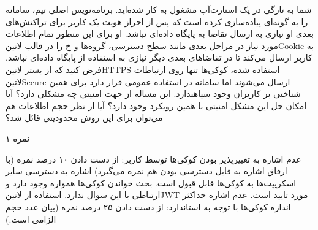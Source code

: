 
شما به تازگی در یک استارت‌آپ مشغول به کار شده‌اید.
برنامه‌نویس اصلی تیم، سامانه را به گونه‌ای پیاده‌سازی کرده است که پس از احراز هویت یک کاربر
برای تراکنش‌های بعدی او نیازی به ارسال تقاضا به پایگاه داده‌ای نباشد.
او برای این منظور تمام اطلاعات مورد نیاز در مراحل بعدی مانند سطح دسترسی، گروه‌ها و ‌خ را در قالب ‌لاتین{Cookie}
به کاربر ارسال می‌کند تا در تقاضاهای بعدی دیگر نیازی به استفاده از پایگاه داده‌ای نباشد.
فرض کنید که از بستر ‌لاتین{HTTPS} استفاده شده، کوکی‌ها تنها روی ارتباطات  لاتین{Secure} ارسال می‌شوند اما سامانه در استفاده عمومی قرار دارد برای همین شناختی بر کاربران وجود ‌سیاه{ندارد}.
این مساله از جهت امنیتی چه مشکلی دارد؟ آیا امکان حل این مشکل امنیتی با همین رویکرد وجود دارد؟
آیا از نظر حجم اطلاعات هم می‌توان برای این روش محدودیتی قائل شد؟

۱ نمره

\begin{پاسخ}

 عدم اشاره به تغییرپذیر بودن کوکی‌ها توسط کاربر: از دست دادن ۱۰ درصد نمره (با ارفاق اشاره به قابل دسترسی بودن هم نمره می‌گیرد)
 اشاره به دسترسی سایر اسکریپت‌ها به کوکی‌ها قابل قبول است.
 بحث خواندن کوکی‌ها همواره وجود دارد و ارتباطی با این سوال ندارد.
 استفاده از ‌لاتین{JWT} مورد تایید است.
 عدم اشاره حداکثر اندازه کوکی‌ها با توجه به استاندارد: از دست دادن ۲۵ درصد نمره (بیان عدد حجم الزامی است.)

\end{پاسخ}
